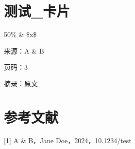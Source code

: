 \documentclass{article}
\begin{document}
\section*{测试\_卡片}

50\% \& \$x\$

来源：A \& B

页码：3

摘录：原文

\section*{参考文献}

[1] A \& B，Jane Doe，2024，10.1234/test\\
\end{document}

